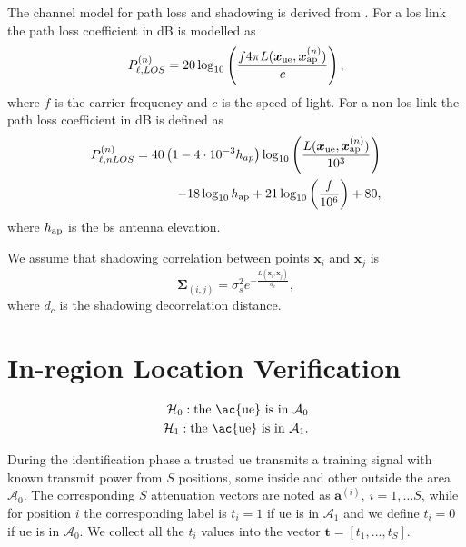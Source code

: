 \documentclass[conference]{IEEEtran}
\begin{document}
The channel model for path loss and shadowing is derived from \cite{3gpp}. For a \ac{los} link the path loss coefficient in dB is modelled as
\begin{equation}\label{eq:los}
    P_{\ell,LOS}^{(n)} = 20\log_{10}\left(\frac{f 4\pi L(\bm{x}_{\rm ue},\bm{x}_{\rm ap}^{(n)})}{c}\right),
\end{equation}
where $f$ is the carrier frequency and $c$ is the speed of light. For a  non-\ac{los} link the path loss coefficient in dB is defined as
\begin{equation}
\begin{split}
    P_{\ell, nLOS}^{(n)} = 40\left(1-4 \cdot 10^{-3}  h_{ap}\right) \log_{10}\left (\frac{L(\bm{x}_{\rm ue},\bm{x}_{\rm ap}^{(n)})}{10^3}\right ) \\
    -18\log_{10}h_{\rm ap}
    + 21\log_{10}\left(\frac{f}{10^6}\right) + 80,
    \end{split}
\end{equation}
where $h_{\rm ap}$ is the \ac{bs} antenna elevation.

We assume that shadowing correlation between points $\bm{x}_i$ and $\bm{x}_j$ is
\begin{equation}\label{eq: coor mat}
    \bm{\Sigma}_{(i,j)} = \sigma_s^2e^{-\frac{L(\bm{x}_i,\bm{x}_j)}{d_c}},
\end{equation}
where $d_c$ is the shadowing decorrelation distance. 


\section{In-region Location Verification}\label{sec: ml}

 \begin{equation}
\begin{split}
  \mathcal H_0: \mbox{the \ac{ue} is in $\mathcal{A}_0$} \\
  \mathcal H_1: \mbox{the \ac{ue} is in $\mathcal{A}_1$}. 
  \end{split}
\end{equation}

During the identification phase a trusted \ac{ue} transmits a training signal with known transmit power from $S$ positions, some inside and other outside the area $\mathcal A_0$. The corresponding $S$ attenuation vectors are noted as $\bm{a}^{(i)}, \ i=1,\dots S$, while for position $i$ the corresponding label is $t_i=1$ if \ac{ue} is in $\mathcal A_1$ and we define $t_i=0$ if \ac{ue} is in $\mathcal A_0$. We collect all the $t_i$ values into the vector $\bm{t}=[t_1,...,t_S]$.
\end{document}
